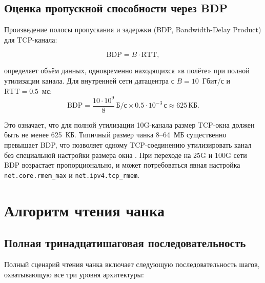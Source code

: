\subsection*{Оценка пропускной способности через BDP}

Произведение полосы пропускания и задержки (BDP, Bandwidth-Delay Product) для TCP-канала:

\begin{equation}
\mathrm{BDP} = B \cdot \mathrm{RTT},
\label{eq:bdp}
\end{equation}

определяет объём данных, одновременно находящихся «в полёте» при полной утилизации канала. Для внутренней сети датацентра с $B = 10$~Гбит/с и $\mathrm{RTT} = 0.5$~мс:
\[
\mathrm{BDP} = \frac{10 \cdot 10^9}{8}\,\text{Б/с} \times 0.5 \cdot 10^{-3}\,\text{с} \approx 625\,\text{КБ}.
\]

Это означает, что для полной утилизации 10G-канала размер TCP-окна должен быть не менее 625~КБ. Типичный размер чанка 8--64~МБ существенно превышает BDP, что позволяет одному TCP-соединению утилизировать канал без специальной настройки размера окна \cite{hennessy2011ca}. При переходе на 25G и 100G сети BDP возрастает пропорционально, и может потребоваться явная настройка \texttt{net.core.rmem\_max} и \texttt{net.ipv4.tcp\_rmem}.

\section{Алгоритм чтения чанка}

\subsection*{Полная тринадцатишаговая последовательность}

Полный сценарий чтения чанка включает следующую последовательность шагов, охватывающую все три уровня архитектуры:

